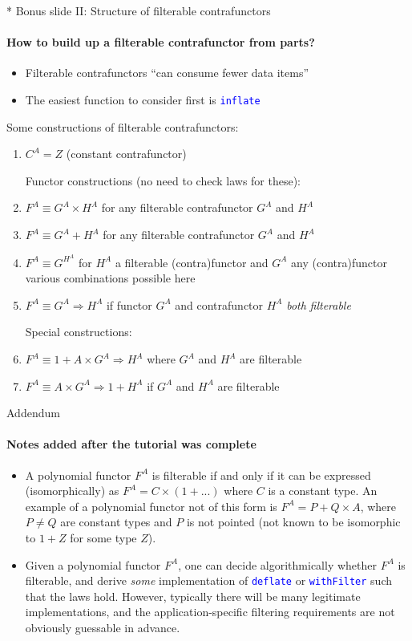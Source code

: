 \documentclass[english]{beamer}
\begin{document}
\begin{frame}{{*} Bonus slide II: Structure of filterable contrafunctors}

\framesubtitle{How to build up a filterable contrafunctor from parts?}
\begin{itemize}
\item Filterable contrafunctors ``can consume fewer data items''
\item The easiest function to consider first is \texttt{\textcolor{blue}{\footnotesize{}inflate}} 
\end{itemize}
Some constructions of filterable contrafunctors:
\begin{enumerate}
\item $C^{A}=Z$ (constant contrafunctor)

Functor constructions (no need to check laws for these): 
\item $F^{A}\equiv G^{A}\times H^{A}$ for any filterable contrafunctor
$G^{A}$ and $H^{A}$
\item $F^{A}\equiv G^{A}+H^{A}$ for any filterable contrafunctor $G^{A}$
and $H^{A}$
\item $F^{A}\equiv G^{H^{A}}$ for $H^{A}$ a filterable (contra)functor
and $G^{A}$ any (contra)functor \textendash{} various combinations
possible here
\item $F^{A}\equiv G^{A}\Rightarrow H^{A}$ if\emph{ }functor $G^{A}$ and
contrafunctor $H^{A}$ \emph{both} \emph{filterable}

Special constructions:
\item $F^{A}\equiv1+A\times G^{A}\Rightarrow H^{A}$ where $G^{A}$ and
$H^{A}$ are filterable
\item $F^{A}\equiv A\times G^{A}\Rightarrow1+H^{A}$ if $G^{A}$ and $H^{A}$
are filterable
\end{enumerate}
\end{frame}

\begin{frame}{Addendum}

\framesubtitle{Notes added after the tutorial was complete}
\begin{itemize}
\item A polynomial functor $F^{A}$ is filterable if and only if it can
be expressed (isomorphically) as $F^{A}=C\times\left(1+...\right)$
where $C$ is a constant type. An example of a polynomial functor
not of this form is $F^{A}=P+Q\times A$, where $P\neq Q$ are constant
types and $P$ is not pointed (not known to be isomorphic to $1+Z$
for some type $Z$).
\item Given a polynomial functor $F^{A}$, one can decide algorithmically
whether $F^{A}$ is filterable, and derive \emph{some} implementation
of \texttt{\textcolor{blue}{\footnotesize{}deflate}} or \texttt{\textcolor{blue}{\footnotesize{}withFilter}}
such that the laws hold. However, typically there will be many legitimate
implementations, and the application-specific filtering requirements
are not obviously guessable in advance.
\end{itemize}
\end{frame}
\end{document}

